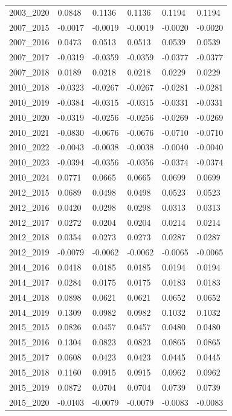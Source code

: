 \begin{table}[htbp]
\begin{tabular}{llllll}
2003_2020 & 0.0848 & 0.1136 & 0.1136 & 0.1194 & 0.1194 \\
2007_2015 & -0.0017 & -0.0019 & -0.0019 & -0.0020 & -0.0020 \\
2007_2016 & 0.0473 & 0.0513 & 0.0513 & 0.0539 & 0.0539 \\
2007_2017 & -0.0319 & -0.0359 & -0.0359 & -0.0377 & -0.0377 \\
2007_2018 & 0.0189 & 0.0218 & 0.0218 & 0.0229 & 0.0229 \\
2010_2018 & -0.0323 & -0.0267 & -0.0267 & -0.0281 & -0.0281 \\
2010_2019 & -0.0384 & -0.0315 & -0.0315 & -0.0331 & -0.0331 \\
2010_2020 & -0.0319 & -0.0256 & -0.0256 & -0.0269 & -0.0269 \\
2010_2021 & -0.0830 & -0.0676 & -0.0676 & -0.0710 & -0.0710 \\
2010_2022 & -0.0043 & -0.0038 & -0.0038 & -0.0040 & -0.0040 \\
2010_2023 & -0.0394 & -0.0356 & -0.0356 & -0.0374 & -0.0374 \\
2010_2024 & 0.0771 & 0.0665 & 0.0665 & 0.0699 & 0.0699 \\
2012_2015 & 0.0689 & 0.0498 & 0.0498 & 0.0523 & 0.0523 \\
2012_2016 & 0.0420 & 0.0298 & 0.0298 & 0.0313 & 0.0313 \\
2012_2017 & 0.0272 & 0.0204 & 0.0204 & 0.0214 & 0.0214 \\
2012_2018 & 0.0354 & 0.0273 & 0.0273 & 0.0287 & 0.0287 \\
2012_2019 & -0.0079 & -0.0062 & -0.0062 & -0.0065 & -0.0065 \\
2014_2016 & 0.0418 & 0.0185 & 0.0185 & 0.0194 & 0.0194 \\
2014_2017 & 0.0284 & 0.0175 & 0.0175 & 0.0183 & 0.0183 \\
2014_2018 & 0.0898 & 0.0621 & 0.0621 & 0.0652 & 0.0652 \\
2014_2019 & 0.1309 & 0.0982 & 0.0982 & 0.1032 & 0.1032 \\
2015_2015 & 0.0826 & 0.0457 & 0.0457 & 0.0480 & 0.0480 \\
2015_2016 & 0.1304 & 0.0823 & 0.0823 & 0.0865 & 0.0865 \\
2015_2017 & 0.0608 & 0.0423 & 0.0423 & 0.0445 & 0.0445 \\
2015_2018 & 0.1160 & 0.0915 & 0.0915 & 0.0962 & 0.0962 \\
2015_2019 & 0.0872 & 0.0704 & 0.0704 & 0.0739 & 0.0739 \\
2015_2020 & -0.0103 & -0.0079 & -0.0079 & -0.0083 & -0.0083 \\

\end{tabular}
\end{table}
